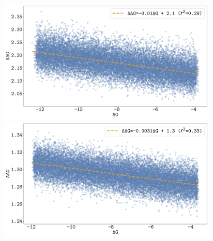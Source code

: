 \documentclass{article}
\begin{document}
\begin{figure}[H]
    \centering
    \begin{minipage}{0.49\linewidth}
        \includegraphics[width=\linewidth]{SimuFold-DG-DDG.pdf}
    \end{minipage}%
    \hfill
    \begin{minipage}{0.49\linewidth}
        \includegraphics[width=\linewidth]{SimuStab-DG-DDG.pdf}
    \end{minipage}


\end{figure}
\end{document}
